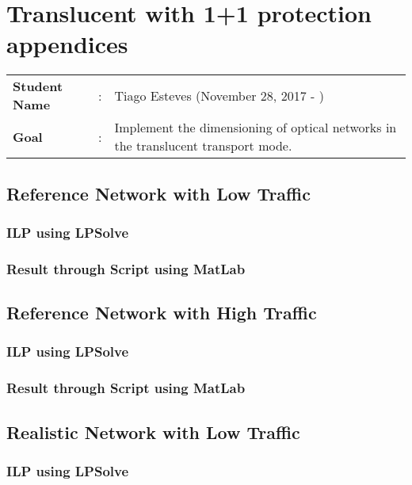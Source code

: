 \clearpage

\section{Translucent with 1+1 protection appendices}
\begin{tcolorbox}	
\begin{tabular}{p{2.75cm} p{0.2cm} p{10.5cm}} 	
\textbf{Student Name}  &:& Tiago Esteves    (November 28, 2017 - )\\
\textbf{Goal}          &:& Implement the dimensioning of optical networks in the translucent transport mode.
\end{tabular}
\end{tcolorbox}

\subsection{Reference Network with Low Traffic}

\subsubsection{ILP using LPSolve}

\subsubsection{Result through Script using MatLab}


\subsection{Reference Network with High Traffic}

\subsubsection{ILP using LPSolve}

\subsubsection{Result through Script using MatLab}


\subsection{Realistic Network with Low Traffic}

\subsubsection{ILP using LPSolve}

